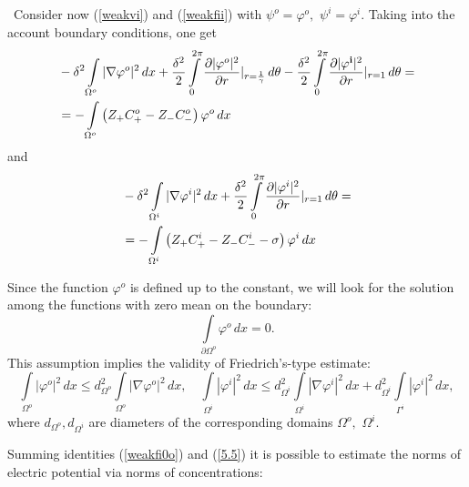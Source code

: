 \documentclass{amsart}
\begin{document}
\
Consider now (\ref{weakvi}) and (\ref{weakfii}) with $\psi^o=\varphi^o,$ $\psi^i=\varphi^i.$ Taking into the account boundary conditions, one get
\begin{equation}\label{weakfi0o}
\begin{aligned}
&-\delta^2 \int\limits_{\Omega^o}|\nabla{\varphi^o}|^2\,dx+\frac{\delta^2}{2}\int\limits_{0}^{2\pi}\frac{\partial {|{\bf \varphi}^o|^2} }{\partial r}|_{r=\frac{1}{\gamma}}\,d\theta-
\frac{\delta^2}{2}\int\limits_{0}^{2\pi}\frac{\partial {|{\bf \varphi^i}|^2} }{\partial r}|_{r=1}\,d\theta=\\
&=  -\int\limits_{\Omega^o}\left(Z_{+}C^o_{+}-Z_{-}C^o_{-}\right){ \varphi}^o\,dx
\end{aligned}
\end{equation}
and
\begin{equation}\label{5.5}
\begin{aligned}
&-\delta^2 \int\limits_{\Omega^i}|\nabla{\varphi^i}|^2\,dx+
\frac{\delta^2}{2}\int\limits_{0}^{2\pi}\frac{\partial {|{\bf \varphi}^i|^2} }{\partial r}|_{r=1}\,d\theta=\\
&=  -\int\limits_{\Omega^i}\left(Z_{+}C^i_{+}-Z_{-}C^i_{-}-\sigma\right){ \varphi}^i\,dx
\end{aligned}
\end{equation}



Since the function $\varphi^o$ is defined up to the constant, we will look for the solution among the functions with zero mean on the boundary:
\begin{equation}\label{zeromeanfi}
\int\limits_{\partial\Omega^o}{\varphi^o}\,dx=0.
\end{equation}
This assumption implies the validity of Friedrich's-type estimate:
\begin{equation}\label{Frfi}
\int\limits_{\Omega^o}|{\varphi^o}|^2\,dx\leq d^2_{\Omega^o}\int\limits_{\Omega^o}|\nabla{\varphi^o}|^2\,dx, \quad \int\limits_{\Omega^i}|{\varphi^i}|^2\,dx\leq d^2_{\Omega^i}\int\limits_{\Omega^i}|\nabla{\varphi^i}|^2\,dx+d^2_{\Omega^i}\int\limits_{\Gamma^i}|{\varphi^i}|^2\,dx,
\end{equation}
where $d_{\Omega^o},d_{\Omega^i}$ are diameters of the corresponding domains $\Omega^o,$ $\Omega^i.$

Summing identities (\ref{weakfi0o}) and (\ref{5.5}) it is possible to estimate the norms of electric potential via norms of concentrations:
\end{document}
